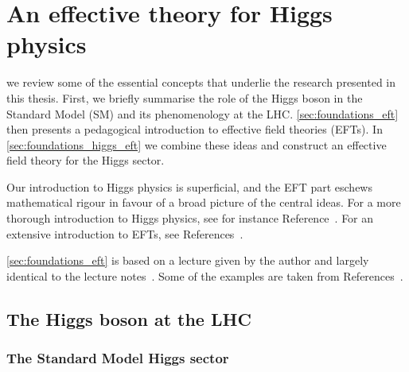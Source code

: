 




\chapter{An effective theory for Higgs physics}
\label{chapter:foundations}

 we review some of the essential concepts
that underlie the research presented in this thesis. First, we briefly
summarise the role of the Higgs boson in the Standard Model (SM) and
its phenomenology at the LHC.  \autoref{sec:foundations_eft} then
presents a pedagogical introduction to effective field theories
(EFTs). In \autoref{sec:foundations_higgs_eft} we combine these ideas
and construct an effective field theory for the Higgs sector.

Our introduction to Higgs physics is superficial, and the EFT part
eschews mathematical rigour in favour of a broad picture of the
central ideas. For a more thorough introduction to Higgs physics, see
for instance Reference~\cite{Plehn:2009nd}. For an extensive
introduction to EFTs, see References~\cite{Georgi:1994qn,
  Kaplan:2005es}.

\autoref{sec:foundations_eft} is based on a lecture given by the
author and largely identical to the lecture
notes~\cite{Brehmer:EFTlecture}. Some of the examples are taken from
References~\cite{Georgi:1994qn, Kaplan:2005es}.



\section{The Higgs boson at the LHC}
\label{sec:foundations_Higgs}


\subsection{The Standard Model Higgs sector}

